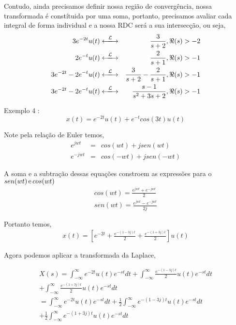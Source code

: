 \documentclass[9pt]{beamer}
\begin{document}
\begin{frame}
 Contudo, ainda precisamos definir nossa  regi\~{a}o de converg\^{e}ncia, nossa transformada \'{e} const\'{i}tuida por uma soma, portanto, precisamos avaliar
 cada integral de forma individual  e a nossa RDC ser\'{a} a sua intersec\c{c}\~{a}o, ou seja,	
 \begin{eqnarray}
   3e^{-2t} u(t) & \xlongleftrightarrow{\mathcal{L}} & \frac {3} {s + 2}, \Re(s) > -2 \nonumber \\
   2e^{-t} u(t) & \xlongleftrightarrow{\mathcal{L}} & \frac {2} {s + 1},  \Re(s) > -1 \nonumber \\
   3e^{-2t} - 2e^{-t} u(t) & \xlongleftrightarrow{\mathcal{L}} & \frac {3} {s + 2} - \frac {2} {s + 1},  \Re(s) > -1  \nonumber \\
   3e^{-2t} - 2e^{-t} u(t) & \xlongleftrightarrow{\mathcal{L}} & \frac {s - 1} {s^2 + 3s  + 2},  \Re(s) > -1  \nonumber  
 \end{eqnarray} 
\end{frame}
\begin{frame}
  \justifying
 Exemplo 4 :
 $$ x(t) = e^{-2t} u(t)  +  e^{-t}cos(3t) u(t) $$
 \par
 Note pela rela\c{c}\~{a}o de Euler temos,
 \begin{eqnarray}
   e^{jwt} & = & cos(wt) + j sen(wt) \nonumber \\
   e^{-jwt} & = & cos(-wt) + j sen (-wt) \nonumber
 \end{eqnarray}
 \par
 A soma e a subtra\c{c}\~{a}o dessas equa\c{c}\~{o}es constroem as express\~{o}es para o $ sen (wt) \, \textup{e} \, cos (wt) $ 
 \begin{eqnarray}
   cos (wt) = \frac {e^{jwt} + e^{-jwt}} {2} \nonumber \\
   sen (wt) = \frac {e^{jwt}  -  e^{-jwt}} {2j} \nonumber
 \end{eqnarray}
 \par
 Portanto temos,
 \begin{eqnarray}
   x(t) = \left[ e^{-2t} + \frac {e^{-(1 - 3j)t}} {2}  + \frac {e^{-(1 + 3j)t}} {2} \right]u(t)  \nonumber 
 \end{eqnarray}
 \end{frame}
 \begin{frame}
   \justifying
   Agora podemos aplicar a transformada da Laplace,
   \par
   \begin{eqnarray}
     X(s)  = \int_{-\infty}^{\infty} e^{-2t} u(t) e^{-st} dt + \int_{-\infty}^{\infty}  \frac {e^{-(1 - 3j)t}} {2} u(t) e^{-st} dt   \nonumber \\
     +  \int_{-\infty}^{\infty} \frac {e^{-(1 + 3j)t}} {2} u(t) e^{-st} dt   \nonumber \\
      =  \int_{-\infty}^{\infty} e^{-2t} u(t)e^{-st} dt +  \frac {1} {2} \int_{-\infty}^{\infty}  e^{-(1 - 3j)t} u(t)e^{-st} dt   \nonumber \\ 
       + \frac {1} {2} \int_{-\infty}^{\infty} e^{-(1 + 3j)t}  u(t)e^{-st} dt 
     \nonumber
   \end{eqnarray}
 \end{frame}
\end{document}
